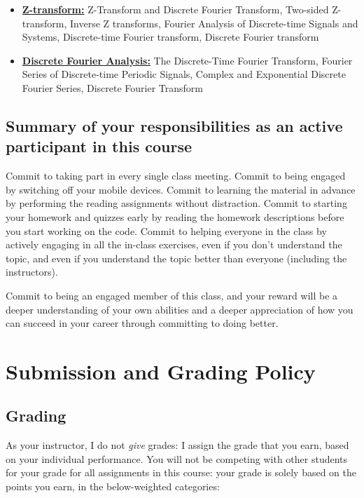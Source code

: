 \documentclass[11pt]{report}
\begin{document}
\begin{itemize}
    \item \textbf{\textcolor{winemaroon}{\underline{Z-transform:}}} Z-Transform and Discrete Fourier Transform, Two-sided Z-transform, Inverse Z transforms, Fourier Analysis of Discrete-time Signals and Systems, Discrete-time Fourier transform, Discrete Fourier transform

    \item \textbf{\textcolor{coral!85!black}{\underline{Discrete Fourier Analysis:}}} The Discrete-Time Fourier Transform, Fourier Series of Discrete-time Periodic Signals, Complex and Exponential Discrete Fourier Series, Discrete Fourier Transform
\end{itemize}

\section*{Summary of your responsibilities as an active participant in this course}
Commit to taking part in every single class meeting. Commit to being engaged by switching off your mobile devices. Commit to learning the material in advance by performing the reading assignments without distraction. Commit to starting your homework and quizzes early by reading the homework descriptions before you start working on the code. Commit to helping everyone in the class by actively engaging in all the in-class exercises, even if you don't understand the topic, and even if you understand the topic better than everyone (including the instructors).

Commit to being an engaged member of this class, and your reward will be a deeper understanding of your own abilities and a deeper appreciation of how you can succeed in your career through committing to doing better.

\chapter{Submission and Grading Policy}

\section*{Grading}
As your instructor, I do not \textit{give} grades: I assign the grade that you earn, based on your individual performance. You will not be competing with other students for your grade for all assignments in this course: your grade is solely based on the points you earn, in the below-weighted categories:
\end{document}
